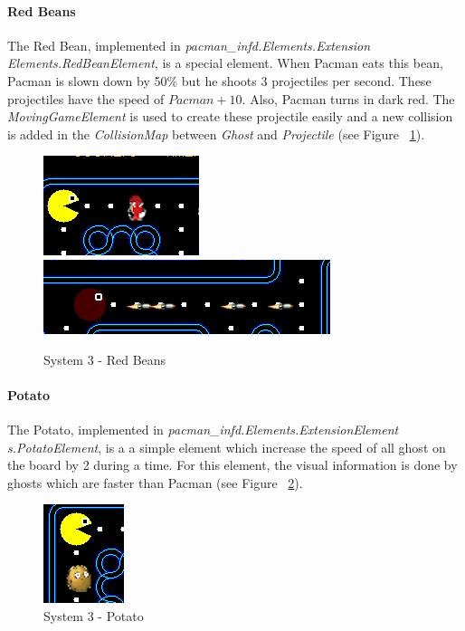 \documentclass{article}
\begin{document}
\paragraph{Red Beans} The Red Bean, implemented in \textit{pacman\_infd.Elements.Extension\\Elements.RedBeanElement}, is a special element. When Pacman eats this bean, Pacman is slown down by 50\% but he shoots 3 projectiles per second. These projectiles have the speed of $Pacman + 10$. Also, Pacman turns in dark red. The \textit{MovingGameElement} is used to create these projectile easily and a new collision is added in the \textit{CollisionMap} between \textit{Ghost} and \textit{Projectile} (see Figure ~\ref{fig:system3RedBeans}).

\begin{figure}
\centering
    \includegraphics[width=.3\linewidth]{imgs/redBeanElement1.PNG}
    \includegraphics[width=.6\linewidth]{imgs/redBeanElement2.PNG}
    \caption{System 3 - Red Beans}
    \label{fig:system3RedBeans}
\end{figure}

\paragraph{Potato} The Potato, implemented in \textit{pacman\_infd.Elements.ExtensionElement\\s.PotatoElement}, is a a simple element which increase the speed of all ghost on the board by 2 during a time. For this element, the visual information is done by ghosts which are faster than Pacman (see Figure ~\ref{fig:system3Potato}).

\begin{figure}
\centering
    \includegraphics[width=.3\linewidth]{imgs/potato.PNG}
    \caption{System 3 - Potato}
    \label{fig:system3Potato}
\end{figure}
\end{document}
